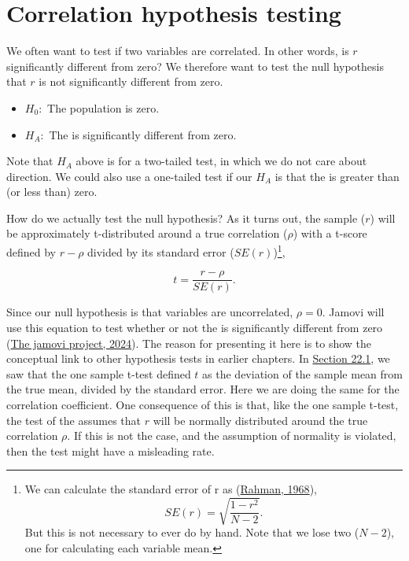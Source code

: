 \documentclass[
  openany]{krantz}
\providecommand{\tightlist}{%
  \setlength{\itemsep}{0pt}\setlength{\parskip}{0pt}}
\begin{document}
\hypertarget{correlation-hypothesis-testing}{%
\section{Correlation hypothesis testing}\label{correlation-hypothesis-testing}}

We often want to test if two variables are correlated.
In other words, is \(r\) significantly different from zero?
We therefore want to test the null hypothesis that \(r\) is not significantly different from zero.

\begin{itemize}
\tightlist
\item
  \(H_{0}:\) The population  is zero.
\item
  \(H_{A}:\) The  is significantly different from zero.
\end{itemize}

Note that \(H_{A}\) above is for a two-tailed test, in which we do not care about direction.
We could also use a one-tailed test if our \(H_{A}\) is that the  is greater than (or less than) zero.

How do we actually test the null hypothesis?
As it turns out, the sample  (\(r\)) will be approximately t-distributed around a true correlation (\(\rho\)) with a t-score defined by \(r - \rho\) divided by its standard error (\(SE(r)\))\footnote{We can calculate the standard error of r as (\protect\hyperlink{ref-Rahman1968}{Rahman, 1968}), \[SE(r) = \sqrt{\frac{1 - r^{2}}{N - 2}}.\] But this is not necessary to ever do by hand. Note that we lose two  (\(N - 2\)), one for calculating each variable mean.},

\[t = \frac{r - \rho}{SE(r)}.\]

Since our null hypothesis is that variables are uncorrelated, \(\rho = 0\).
Jamovi will use this equation to test whether or not the  is significantly different from zero (\protect\hyperlink{ref-Jamovi2022}{The jamovi project, 2024}).
The reason for presenting it here is to show the conceptual link to other hypothesis tests in earlier chapters.
In \protect\hyperlink{one-sample-t-test}{Section 22.1}, we saw that the one sample t-test defined \(t\) as the deviation of the sample mean from the true mean, divided by the standard error.
Here we are doing the same for the correlation coefficient.
One consequence of this is that, like the one sample t-test, the test of the  assumes that \(r\) will be normally distributed around the true correlation \(\rho\).
If this is not the case, and the assumption of normality is violated, then the test might have a misleading  rate.
\end{document}

